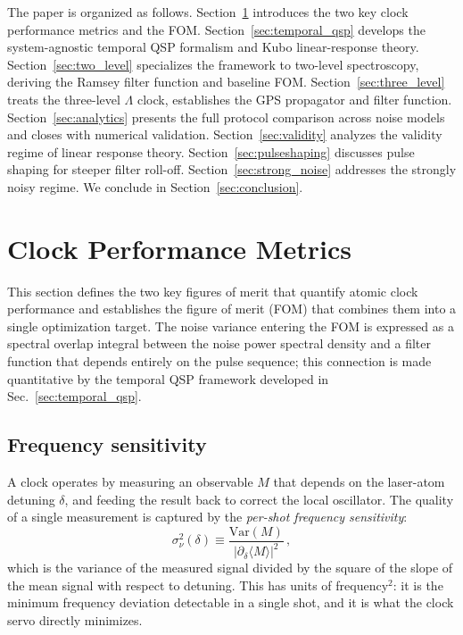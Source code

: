 \documentclass[aps,pra,twocolumn,superscriptaddress,longbibliography]{revtex4-2}
\newcommand{\be}{\begin{equation}}
\newcommand{\ee}{\end{equation}}
\begin{document}
The paper is organized as follows.
Section~\ref{sec:metrics} introduces the two key clock performance metrics and the FOM.
Section~\ref{sec:temporal_qsp} develops the system-agnostic temporal QSP formalism
and Kubo linear-response theory.
Section~\ref{sec:two_level} specializes the framework to two-level spectroscopy,
deriving the Ramsey filter function and baseline FOM.
Section~\ref{sec:three_level} treats the three-level $\Lambda$ clock, establishes
the GPS propagator and filter function.
Section~\ref{sec:analytics} presents the full protocol comparison across noise models
and closes with numerical validation.
Section~\ref{sec:validity} analyzes the validity regime of linear response theory.
Section~\ref{sec:pulseshaping} discusses pulse shaping for steeper filter roll-off.
Section~\ref{sec:strong_noise} addresses the strongly noisy regime.
We conclude in Section~\ref{sec:conclusion}.


\section{Clock Performance Metrics}
\label{sec:metrics}

This section defines the two key figures of merit that quantify atomic clock performance
and establishes the figure of merit (FOM) that combines them into a single optimization target.
The noise variance entering the FOM is expressed as a spectral overlap integral
between the noise power spectral density and a filter function that depends entirely
on the pulse sequence; this connection is made quantitative by the temporal QSP
framework developed in Sec.~\ref{sec:temporal_qsp}.

\subsection{Frequency sensitivity}
\label{sec:freq_sensitivity}

A clock operates by measuring an observable $M$ that depends on the laser-atom detuning
$\delta$, and feeding the result back to correct the local oscillator.
The quality of a single measurement is captured by the \emph{per-shot frequency sensitivity}:
\be
  \sigma^2_\nu(\delta) \equiv \frac{\mathrm{Var}(M)}{|\partial_\delta \langle M \rangle|^2}\,,
  \label{eq:sigma_nu}
\ee
which is the variance of the measured signal divided by the square of the slope of the
mean signal with respect to detuning.
This has units of frequency$^2$: it is the minimum frequency deviation detectable
in a single shot, and it is what the clock servo directly minimizes.
\end{document}
